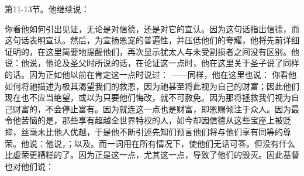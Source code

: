 第11-13节。他继续说：\par

你看他如何引出见证，无论是对信德，还是对它的宣认。因为这句话指出信德，而这句话表明宣认。然后，为宣扬恩宠的普遍性，并压低他们的夸耀，他将先前详细证明的，在这里简要地提醒他们，再次显示犹太人与未受割损者之间没有区别。他说：他说，他论及圣父时所说的话，在论证这一点时，他在这里关于圣子说了同样的话。因为正如他以前在肯定这一点时说过： ——同样，他在这里也说： 你看他如何将祂描述为极其渴望我们的救恩，因为祂甚至将此视为自己的财富；因此他们现在也不应当绝望，或以为只要他们悔改，就不可赦免。因为那将拯救我们视为自己财富的，不会停止富有。因为就连这一点也是财富，即恩赐倾注于众人。因为最令他苦恼的是，那些享有超越全世界特权的人，如今却因信德从这些宝座上被贬抑，丝毫未比他人优越，于是他不断引述先知们预言他们将与他们享有同等的尊荣。他说：他说，；以及。而一词用在所有情况下，使他们无话可答。但没有什么比虚荣更糟糕的了。因为正是这一点，尤其这一点，导致了他们的毁灭。因此基督也对他们说： 